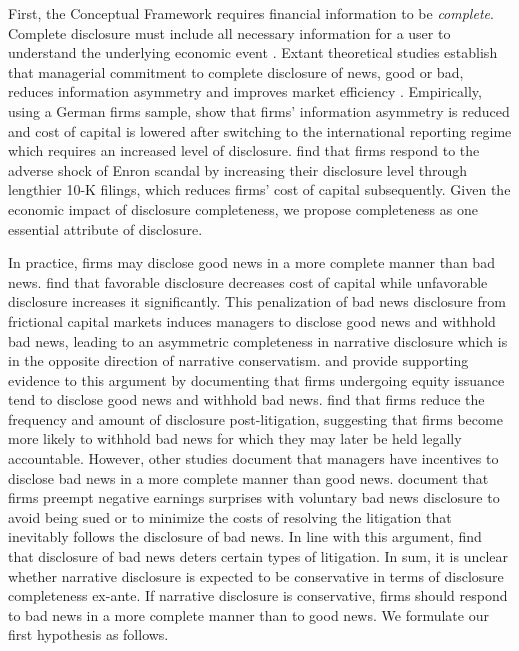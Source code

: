 \documentclass[letterpaper,11pt]{article}
\begin{document}
\begin{spacing}{1.5}
First, the Conceptual Framework requires financial information to be \textit{complete}. Complete disclosure must include all necessary information for a user to understand the underlying economic event \cite{fasbConceptualFrameworkFinancial2018}. Extant theoretical studies establish that managerial commitment to complete disclosure of news, good or bad, reduces information asymmetry and improves market efficiency \cite{glostenBidAskTransaction1985, diamondOptimalReleaseInformation1985, diamondDisclosureLiquidityCost1991, baimanRelationCapitalMarkets1996}. Empirically, using a German firms sample,  show that firms' information asymmetry is reduced and cost of capital is lowered after switching to the international reporting regime which requires an increased level of disclosure.  find that firms respond to the adverse shock of Enron scandal by increasing their disclosure level through lengthier 10-K filings, which reduces firms' cost of capital subsequently. Given the economic impact of disclosure completeness, we propose completeness as one essential attribute of disclosure.

In practice, firms may disclose good news in a more complete manner than bad news.  find that favorable disclosure decreases cost of capital while unfavorable disclosure increases it significantly. This penalization of bad news disclosure from frictional capital markets induces managers to disclose good news and withhold bad news, leading to an asymmetric completeness in narrative disclosure which is in the opposite direction of narrative conservatism.  and  provide supporting evidence to this argument by documenting that firms undergoing equity issuance tend to disclose good news and withhold bad news.  find that firms reduce the frequency and amount of disclosure post-litigation, suggesting that firms become more likely to withhold bad news for which they may later be held legally accountable. However, other studies document that managers have incentives to disclose bad news in a more complete manner than good news.  document that firms preempt negative earnings surprises with voluntary bad news disclosure to avoid being sued or to minimize the costs of resolving the litigation that inevitably follows the disclosure of bad news. In line with this argument,  find that disclosure of bad news deters certain types of litigation. In sum, it is unclear whether narrative disclosure is expected to be conservative in terms of disclosure completeness ex-ante. If narrative disclosure is conservative, firms should respond to bad news in a more complete manner than to good news. We formulate our first hypothesis as follows.


\end{spacing}
\end{document}
